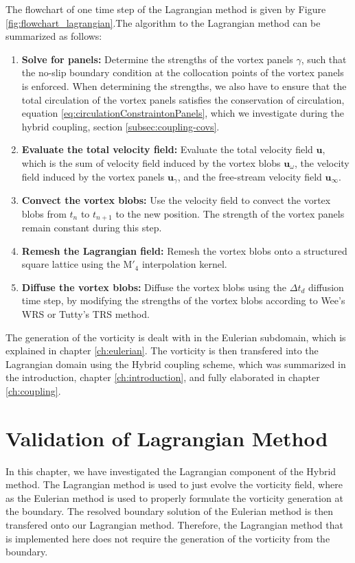 The flowchart of one time step of the Lagrangian method is given by Figure \ref{fig:flowchart_lagrangian}.The algorithm to the Lagrangian method can be summarized as follows:
	\begin{enumerate}
	\item \textbf{Solve for panels:} Determine the strengths of the vortex panels $\gamma$, such that the no-slip boundary condition at the collocation points of the vortex panels is enforced. When determining the strengths, we also have to ensure that the total circulation of the vortex panels satisfies the conservation of circulation, equation \ref{eq:circulationConstraintonPanels}, which we investigate during the hybrid coupling, section \ref{subsec:coupling-covs}.
	
	\item \textbf{Evaluate the total velocity field:} Evaluate the total velocity field $\mathbf{u}$, which is the sum of velocity field induced by the vortex blobs $\mathbf{u}_{\omega}$, the velocity field induced by the vortex panels $\mathbf{u}_{\gamma}$, and the free-stream velocity field $\mathbf{u}_{\infty}$. 
	\item \textbf{Convect the vortex blobs:} Use the velocity field to convect the vortex blobs from $t_n$ to $t_{n+1}$ to the new position. The strength of the vortex panels remain constant during this step.
	\item \textbf{Remesh the Lagrangian field:} Remesh the vortex blobs onto a structured square lattice using the $\mathrm{M}'_4$ interpolation kernel.
	\item \textbf{Diffuse the vortex blobs:} Diffuse the vortex blobs using the $\Delta t_d$ diffusion time step, by modifying the strengths of the vortex blobs according to Wee's WRS or Tutty's TRS method.
	\end{enumerate}

The generation of the vorticity is dealt with in the Eulerian subdomain, which is explained in chapter \ref{ch:eulerian}. The vorticity is then transfered into the Lagrangian domain using the Hybrid coupling scheme, which was summarized in the introduction, chapter \ref{ch:introduction}, and fully elaborated in chapter \ref{ch:coupling}.

%
\section{Validation of Lagrangian Method}
\label{sec:volm}
In this chapter, we have investigated the Lagrangian component of the Hybrid method. The Lagrangian method is used to just evolve the vorticity field, where as the Eulerian method is used to properly formulate the vorticity generation at the boundary. The resolved boundary solution of the Eulerian method is then transfered onto our Lagrangian method. Therefore, the Lagrangian method that is implemented here does not require the generation of the vorticity from the boundary. 

